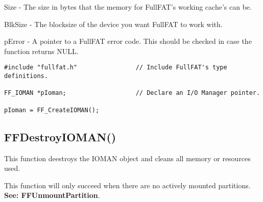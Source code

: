 Size - The size in bytes that the memory for FullFAT's working cache's can be.

BlkSize - The blocksize of the device you want FullFAT to work with.

pError - A pointer to a FullFAT error code. This should be checked in case the function returns NULL.

\begin{lstlisting}
#include "fullfat.h" 				// Include FullFAT's type definitions.

FF_IOMAN *pIoman;					// Declare an I/O Manager pointer.

pIoman = FF_CreateIOMAN();

\end{lstlisting}


\subsection{FF\textunderscore DestroyIOMAN()}

This function deestroys the IOMAN object and cleans all memory or resources used.

This function will only succeed when there are no actively mounted partitions. \textbf{See: FF\textunderscore UnmountPartition}.
